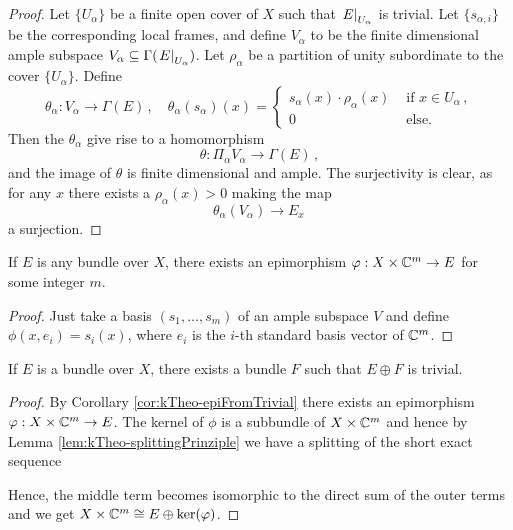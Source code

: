 \begin{proof}
	Let $\{U_\alpha\}$ be a finite open cover of $X$ such that $\left.E\right|_{U_\alpha}$ is trivial. Let $\{s_{\alpha,i}\}$ be the corresponding local frames, and define $V_\alpha$ to be the finite dimensional ample subspace $V_\alpha\subseteq \Gamma(\left.E\right|_{U_\alpha})$. Let $\rho_\alpha$ be a partition of unity subordinate to the cover $\{U_\alpha\}$. Define 
	\begin{equation*}
		\theta_\alpha: V_\alpha \to \Gamma(E)\,,\quad \theta_\alpha(s_\alpha)(x)=\begin{cases}
			s_\alpha(x)\cdot \rho_\alpha(x) & \text{ if } x\in U_\alpha\,,\\
			0 & \text{ else.}
		\end{cases}
	\end{equation*} Then the $\theta_\alpha$ give rise to a homomorphism 
	\begin{equation*}
		\theta: \Pi_\alpha V_\alpha \to \Gamma(E)\,,
	\end{equation*} and the image of $\theta$
	is finite dimensional and ample. The surjectivity is clear, as for any $x$ there exists a $\rho_\alpha(x)>0$ making the map 
	\begin{equation*}
		\theta_\alpha(V_\alpha)\to E_x\,
	\end{equation*} a surjection.
\end{proof}
\begin{corollary}\label{cor:kTheo-epiFromTrivial}
	If $E$ is any bundle over $X$, there exists an epimorphism $\varphi:X\times \mathbb{C}^m \to E$ for some integer $m$.
\end{corollary}
\begin{proof}
	Just take a basis $(s_1,\dots,s_m)$ of an ample subspace $V$ and define $\phi(x,e_i)=s_i(x)$, where $e_i$ is the $i$-th standard basis vector of $\mathbb{C}^m$.
\end{proof}
\begin{corollary}\label{cor:kTheo-splittingTrivial}
	If $E$ is a bundle over $X$, there exists a bundle $F$ such that $E\oplus F$ is trivial.
\end{corollary}
\begin{proof}
	By Corollary \ref{cor:kTheo-epiFromTrivial} there exists an epimorphism $\varphi:X\times \mathbb{C}^m \to E$. The kernel of $\phi$ is a subbundle of $X\times \mathbb{C}^m$  and hence by Lemma \ref{lem:kTheo-splittingPrinziple} we have a splitting of the short exact sequence
	\begin{center}
	\end{center} Hence, the middle term becomes isomorphic to the direct sum of the outer terms and we get
	$X\times \mathbb{C}^m\cong E\oplus \ker(\varphi)$.
\end{proof}
